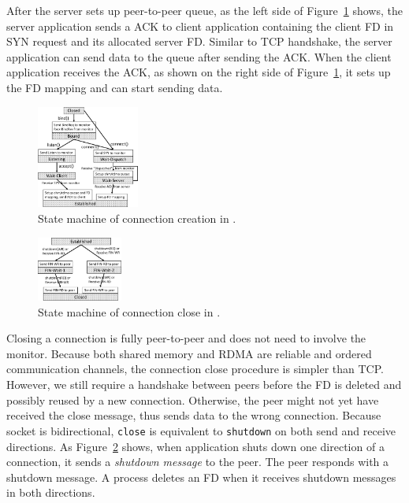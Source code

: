 After the server sets up peer-to-peer queue, as the left side of Figure~\ref{fig:conn-setup} shows, the server application sends a ACK to client application containing the client FD in SYN request and its allocated server FD.
Similar to TCP handshake, the server application can send data to the queue after sending the ACK.
When the client application receives the ACK, as shown on the right side of Figure~\ref{fig:conn-setup}, it sets up the FD mapping and can start sending data.

\begin{figure}[t!]
	\centering
	\includegraphics[width=0.3\textwidth]{images/conn-setup-new}
	\vspace{-5pt}
	\caption{State machine of connection creation in \libipc{}.}
	\label{fig:conn-setup}
\end{figure}
\begin{figure}[t!]
	\centering
	\includegraphics[width=0.25\textwidth]{images/conn-close-new}
	\vspace{-5pt}
	\caption{State machine of connection close in \libipc{}.}
	\label{fig:conn-close}
\end{figure}


Closing a connection is fully peer-to-peer and does not need to involve the monitor.
Because both shared memory and RDMA are reliable and ordered communication channels, the connection close procedure is simpler than TCP.
However, we still require a handshake between peers before the FD is deleted and possibly reused by a new connection.
Otherwise, the peer might not yet have received the close message, thus sends data to the wrong connection.
Because socket is bidirectional, \texttt{close} is equivalent to \texttt{shutdown} on both send and receive directions.
As Figure~\ref{fig:conn-close} shows, when application shuts down one direction of a connection, it sends a \emph{shutdown message} to the peer.
The peer responds with a shutdown message.
A process deletes an FD when it receives shutdown messages in both directions.



